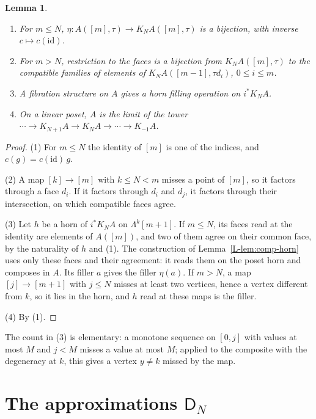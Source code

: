\documentclass[11pt]{article}
\newcommand{\id}{\mathrm{id}}
\newcommand{\D}{\mathsf{D}}
\newcommand{\Lam}{\Lambda}
\theoremstyle{plain}
\newtheorem{lemma}[theorem]{Lemma}
\theoremstyle{definition}
\theoremstyle{remark}
\begin{document}
\begin{lemma}\label{lem:cosk}
\leavevmode
\begin{enumerate}
\item For $m\le N$, $\eta:A([m],\tau)\to K_NA([m],\tau)$ is a bijection,
  with inverse $c\mapsto c(\id)$.
\item For $m>N$, restriction to the faces is a bijection from
  $K_NA([m],\tau)$ to the compatible families of elements of
  $K_NA([m-1],\tau d_i)$, $0\le i\le m$.
\item A fibration structure on $A$ gives a horn filling operation on
  $i^*K_NA$.
\item On a linear poset, $A$ is the limit of the tower
  $\cdots\to K_{N+1}A\to K_NA\to\cdots\to K_{-1}A$.
\end{enumerate}
\end{lemma}

\begin{proof}
(1) For $m\le N$ the identity of $[m]$ is one of the indices, and
$c(g)=c(\id)\,g$.

(2) A map $[k]\to[m]$ with $k\le N<m$ misses a point of $[m]$, so it
factors through a face $d_i$. If it factors through $d_i$ and $d_j$, it
factors through their intersection, on which compatible faces agree.

(3) Let $h$ be a horn of $i^*K_NA$ on $\Lam^k[m+1]$. If $m\le N$, its faces
read at the identity are elements of $A([m])$, and two of them agree on
their common face, by the naturality of $h$ and (1). The construction of
Lemma~\ref{L-lem:comp-horn} uses only these faces and their agreement: it
reads them on the poset horn and composes in $A$. Its filler $a$ gives the
filler $\eta(a)$. If $m>N$, a map $[j]\to[m+1]$ with $j\le N$ misses at least
two vertices, hence a vertex different from $k$, so it lies in the horn,
and $h$ read at these maps is the filler.

(4) By (1).
\end{proof}

The count in (3) is elementary: a monotone sequence on $[0,j]$ with values
at most $M$ and $j<M$ misses a value at most $M$; applied to the
composite with the degeneracy at $k$, this gives a vertex $y\ne k$
missed by the map.

\section{The approximations $\D_N$}\label{sec:DN}
\end{document}
